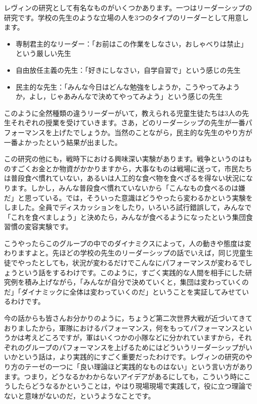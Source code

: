 \documentclass{ltjsbook}
\begin{document}
レヴィンの研究として有名なものがいくつかあります。一つはリーダーシップの研究です。学校の先生のような立場の人を3つのタイプのリーダーとして用意します。
\begin{itemize}
    \item 専制君主的なリーダー：「お前はこの作業をしなさい，おしゃべりは禁止」という厳しい先生
    \item 自由放任主義の先生：「好きにしなさい，自学自習で」という感じの先生
    \item 民主的な先生：「みんな今日はどんな勉強をしようか，こうやってみようか，よし，じゃあみんなで決めてやってみよう」という感じの先生
\end{itemize}

このように全然種類の違うリーダーがいて，教えられる児童生徒たちは3人の先生それぞれの授業を受けていきます。さあ，どのリーダーシップの先生が一番パフォーマンスを上げたでしょうか。当然のことながら，民主的な先生のやり方が一番よかったという結果が出ました。

この研究の他にも，戦時下における興味深い実験があります。戦争というのはものすごくお金とか物資がかかりますから，大事なものは戦場に送って，市民たちは普段食べ慣れていない，あるいは人工的な食べ物を食べざるを得ない状況になります。しかし，みんな普段食べ慣れていないから「こんなもの食べるのは嫌だ」と思っている。では，そういった意識はどうやったら変わるかという実験をしました。全員でディスカッションをしたり，いろいろ試行錯誤して，みんなで「これを食べましょう」と決めたら，みんなが食べるようになったという集団食習慣の変容実験です。

こうやったらこのグループの中でのダイナミクスによって，人の動きや態度は変わりますよと。先ほどの学校の先生のリーダーシップの話でいえば，同じ児童生徒でやったとしても，状況が変わるだけでこんなにパフォーマンスが変わるでしょうという話をするわけです。このように，すごく実践的な人間を相手にした研究例を積み上げながら，「みんなが自分で決めていくと，集団は変わっていくのだ」「ダイナミックに全体は変わっていくのだ」ということを実証してみせているわけです。

今の話からも皆さんお分かりのように，ちょうど第二次世界大戦が近づいてきておりましたから，軍隊におけるパフォーマンス，何をもってパフォーマンスというかは考えどころですが，軍はいくつかの小隊などに分かれていますから，それぞれのグループのパフォーマンスを上げるためにはどういうリーダーシップがいいかという話は，より実践的にすごく重要だったわけです。レヴィンの研究のやり方のテーゼの一つに「良い理論ほど実践的なものはない」という言い方があります。つまり，どうなるかわからないアイデアがあるにしても，こういう時にこうしたらどうなるかということは，やはり現場現場で実践して，役に立つ理論でないと意味がないのだ，というようなことです。
\end{document}

